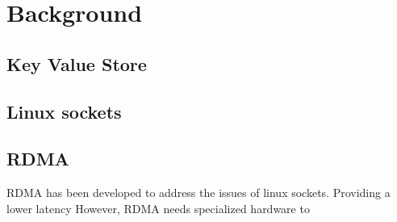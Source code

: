 
\chapter{Background}\label{ch:background} %



\ifpdf
    \graphicspath{{7/figures/PNG/}{7/figures/PDF/}{7/figures/}}
\else
    \graphicspath{{7/figures/EPS/}{7/figures/}}
\fi


% 
\section[KV-store]{Key Value Store}\label{sec:kv-store}

\section[Linux scokets]{Linux sockets}\label{sec:linux-sockets}

\section[RDMA]{RDMA}\label{sec:rdma}
RDMA has been developed to address the issues of linux sockets.
Providing a lower latency
However, RDMA needs specialized hardware to



